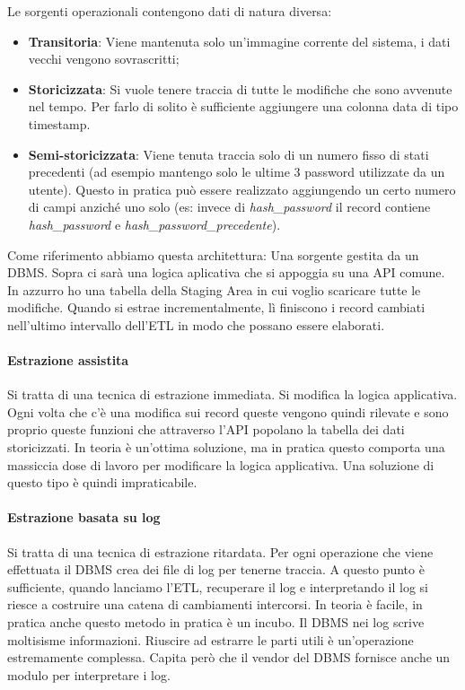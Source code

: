 \noindent Le sorgenti operazionali contengono dati di natura diversa:
\begin{itemize}
	\item \textbf{Transitoria}: Viene mantenuta solo un'immagine corrente del sistema, i  dati vecchi vengono sovrascritti;
	\item \textbf{Storicizzata}: Si vuole tenere traccia di tutte le modifiche che sono avvenute nel tempo. Per farlo di solito è sufficiente  aggiungere una colonna data di tipo timestamp.
	\item \textbf{Semi-storicizzata}: Viene tenuta traccia solo di un numero fisso di stati precedenti (ad esempio mantengo solo le ultime 3 password utilizzate da un utente). Questo in pratica può essere realizzato aggiungendo un certo numero di campi anziché uno solo (es: invece di \textit{hash\_password} il record contiene \textit{hash\_password} e \textit{hash\_password\_precedente}).
\end{itemize}
\noindent Come riferimento abbiamo questa architettura:\newline
Una sorgente gestita da un DBMS. Sopra ci sarà una logica aplicativa che si appoggia su una API comune. In azzurro ho una tabella della Staging Area in cui voglio scaricare tutte le modifiche. Quando si estrae incrementalmente, lì finiscono i record cambiati nell'ultimo intervallo dell'ETL in modo che possano essere elaborati.

\paragraph{Estrazione assistita}
Si tratta di una tecnica di estrazione immediata. Si modifica la logica applicativa. Ogni volta che c'è una modifica sui record queste vengono quindi rilevate e sono proprio queste funzioni che attraverso l'API popolano la tabella dei dati storicizzati. In teoria è un'ottima soluzione, ma in pratica questo comporta una massiccia dose di lavoro per modificare la logica applicativa. Una soluzione di questo tipo è quindi impraticabile.


\paragraph{Estrazione basata su log}
Si tratta di una tecnica di estrazione ritardata. Per ogni operazione che viene effettuata il DBMS crea dei file di log per tenerne traccia. A questo punto è sufficiente, quando lanciamo l'ETL, recuperare il log e interpretando il log si riesce a costruire una catena di cambiamenti intercorsi. In teoria è facile, in pratica anche questo metodo in pratica è un incubo. Il DBMS nei log scrive moltisisme informazioni. Riuscire ad estrarre le parti utili è un'operazione estremamente complessa. Capita però che il vendor del DBMS fornisce anche un modulo per interpretare i log.


